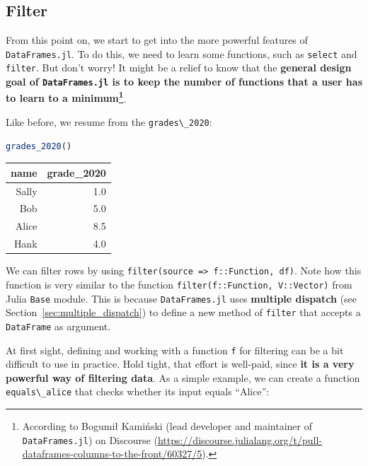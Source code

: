 \documentclass[
  notoc %
]{tufte-book}
\newcommand{\passthrough}[1]{#1}
\begin{document}
\hypertarget{sec:filter}{%
\subsection{Filter}\label{sec:filter}}

From this point on, we start to get into the more powerful features of
\passthrough{\lstinline!DataFrames.jl!}. To do this, we need to learn
some functions, such as \passthrough{\lstinline!select!} and
\passthrough{\lstinline!filter!}. But don't worry! It might be a relief
to know that the \textbf{general design goal of
\passthrough{\lstinline!DataFrames.jl!} is to keep the number of
functions that a user has to learn to a minimum\footnote{According to
  Bogumił Kamiński (lead developer and maintainer of
  \passthrough{\lstinline!DataFrames.jl!}) on Discourse
  (\url{https://discourse.julialang.org/t/pull-dataframes-columns-to-the-front/60327/5}).}}.

Like before, we resume from the \passthrough{\lstinline!grades\_2020!}:

\begin{lstlisting}[language=Julia]
grades_2020()
\end{lstlisting}

\begin{longtable}[]{@{}rr@{}}
\toprule()
name & grade\_2020 \\
\midrule()
\endhead
Sally & 1.0 \\
Bob & 5.0 \\
Alice & 8.5 \\
Hank & 4.0 \\
\bottomrule()
\end{longtable}

We can filter rows by using
\passthrough{\lstinline!filter(source => f::Function, df)!}. Note how
this function is very similar to the function
\passthrough{\lstinline!filter(f::Function, V::Vector)!} from Julia
\passthrough{\lstinline!Base!} module. This is because
\passthrough{\lstinline!DataFrames.jl!} uses \textbf{multiple dispatch}
(see Section~\ref{sec:multiple_dispatch}) to define a new method of
\passthrough{\lstinline!filter!} that accepts a
\passthrough{\lstinline!DataFrame!} as argument.

At first sight, defining and working with a function
\passthrough{\lstinline!f!} for filtering can be a bit difficult to use
in practice. Hold tight, that effort is well-paid, since \textbf{it is a
very powerful way of filtering data}. As a simple example, we can create
a function \passthrough{\lstinline!equals\_alice!} that checks whether
its input equals ``Alice'':
\end{document}
